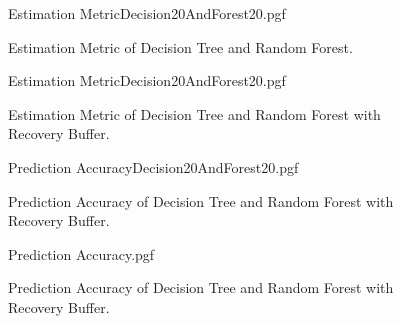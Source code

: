 \documentclass[letterpaper, 10 pt, conference]{ieeeconf}  %
\begin{document}
%
%

\begin{figure}[!htb]
	\begin{center}
		{Estimation MetricDecision20AndForest20.pgf}
	\end{center}
	\caption[Estimation Metric of Decision Tree and Random Forest]{Estimation Metric of Decision Tree and Random Forest.}
	\label{fig:Estimation Accuracy EKF-ignore DT and RF}
\end{figure}

\begin{figure}[!htb]
	\begin{center}
		{Estimation MetricDecision20AndForest20.pgf}
	\end{center}
	\caption[Estimation Metric of Decision Tree and Random Forest with Recovery Buffer]{Estimation Metric of Decision Tree and Random Forest with Recovery Buffer.}
	\label{fig:Estimation Accuracy EKF-ignore DT and RF with Recovery Buffer}
\end{figure}

\begin{figure}[!htb]
	\begin{center}
		{Prediction AccuracyDecision20AndForest20.pgf}
	\end{center}
	\caption[Prediction Accuracy of Decision Tree and Random Forest with Recovery Buffer]{Prediction Accuracy of Decision Tree and Random Forest with Recovery Buffer.}
	\label{fig:Summary Prediction Accuracy EKF-ignore DT and RF with Recovery Buffer}
\end{figure}


\begin{figure}[!htb]
	\begin{center}
		{Prediction Accuracy.pgf}
	\end{center}
	\caption[Prediction Accuracy of Decision Tree and Random Forest with Recovery Buffer]{Prediction Accuracy of Decision Tree and Random Forest with Recovery Buffer.}
	\label{fig:Prediction Accuracy EKF-ignore DT and RF with Recovery Buffer}
\end{figure}
\end{document}
